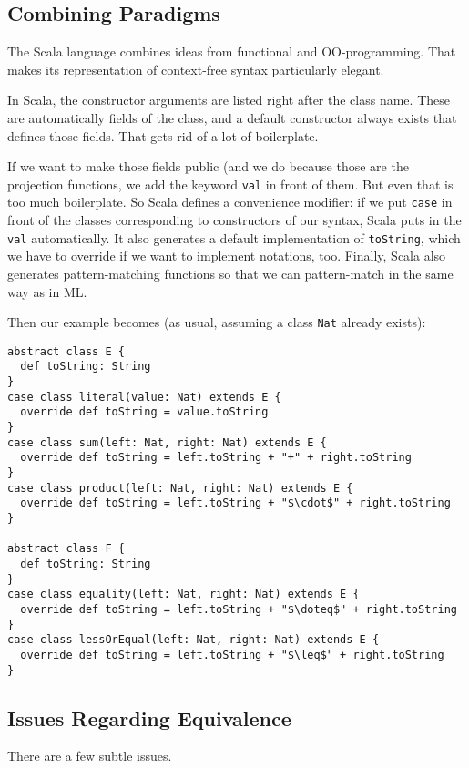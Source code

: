 \subsection{Combining Paradigms}

The Scala language combines ideas from functional and OO-programming.
That makes its representation of context-free syntax particularly elegant.

In Scala, the constructor arguments are listed right after the class name.
These are automatically fields of the class, and a default constructor always exists that defines those fields.
That gets rid of a lot of boilerplate.

If we want to make those fields public (and we do because those are the projection functions, we add the keyword \texttt{val} in front of them.
But even that is too much boilerplate. So Scala defines a convenience modifier: if we put \texttt{case} in front of the classes corresponding to constructors of our syntax, Scala puts in the \texttt{val} automatically.
It also generates a default implementation of \texttt{toString}, which we have to override if we want to implement notations, too.
Finally, Scala also generates pattern-matching functions so that we can pattern-match in the same way as in ML.

Then our example becomes (as usual, assuming a class \texttt{Nat} already exists):

\begin{lstlisting}
abstract class E {
  def toString: String
}
case class literal(value: Nat) extends E {
  override def toString = value.toString
}
case class sum(left: Nat, right: Nat) extends E {
  override def toString = left.toString + "+" + right.toString
}
case class product(left: Nat, right: Nat) extends E {
  override def toString = left.toString + "$\cdot$" + right.toString
}

abstract class F {
  def toString: String
}
case class equality(left: Nat, right: Nat) extends E {
  override def toString = left.toString + "$\doteq$" + right.toString
}
case class lessOrEqual(left: Nat, right: Nat) extends E {
  override def toString = left.toString + "$\leq$" + right.toString
}
\end{lstlisting}

\subsection{Issues Regarding Equivalence}

There are a few subtle issues.

